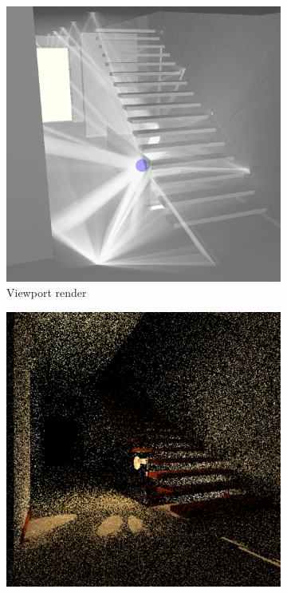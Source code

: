 \begin{figure}
	\centering
	\begin{subfigure}[t]{0.32\linewidth}
		\includegraphics[width=\textwidth]{chapters/chapter_thetool/imagewidget_paths}
		\caption{Viewport render}
		\label{imagewidget_paths}
	\end{subfigure}
	\begin{subfigure}[t]{0.32\linewidth}
		\includegraphics[width=\textwidth]{chapters/chapter_thetool/imagewidget_radiance}

\end{subfigure}
\end{figure}
